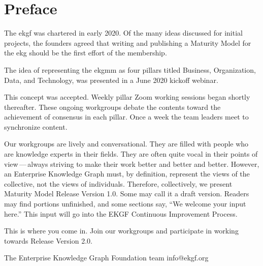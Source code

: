 \chapter{Preface}\label{ch:ekg-mm-preface}

The \gls{ekgf} was chartered in early 2020.
Of the many ideas discussed for initial projects, the founders agreed that writing and publishing a Maturity Model
for the \gls{ekg} should be the first effort of the membership.

The idea of representing the \gls{ekgmm} as four pillars titled Business, Organization, Data, and Technology,
was presented in a June 2020 kickoff webinar.

This concept was accepted.
Weekly pillar Zoom working sessions began shortly thereafter.
These ongoing workgroups debate the contents toward the achievement of consensus in each pillar.
Once a week the team leaders meet to synchronize content.

Our workgroups are lively and conversational.
They are filled with people who are knowledge experts in their fields.
They are often quite vocal in their points of view\,---\,always striving to make their work better and better and better.
However, an Enterprise Knowledge Graph must, by definition, represent the views of the collective,
not the views of individuals.
Therefore, collectively, we present Maturity Model Release Version 1.0.
Some may call it a draft version.
Readers may find portions unfinished, and some sections say, “We welcome your input here.”
This input will go into the EKGF Continuous Improvement Process.

This is where you come in.
Join our workgroups and participate in working towards Release Version 2.0.

The Enterprise Knowledge Graph Foundation team \newline
info@ekgf.org
